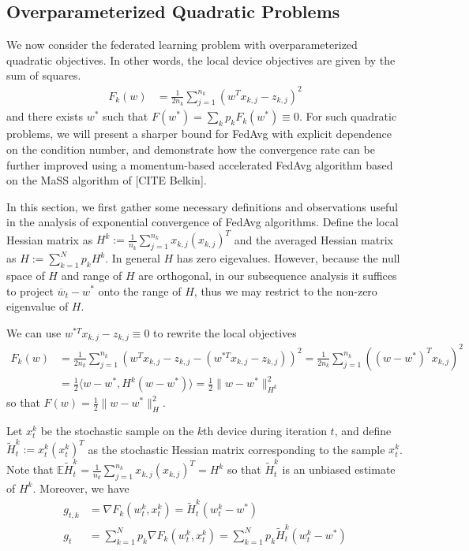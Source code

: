 \subsection{Overparameterized Quadratic Problems}

We now consider the federated learning problem with overparameterized
quadratic objectives. In other words, the local device objectives
are given by the sum of squares. 
\begin{align*}
F_{k}(w) & =\frac{1}{2n_{k}}\sum_{j=1}^{n_{k}}(w^{T}x_{k,j}-z_{k,j})^{2}
\end{align*}
and there exists $w^{\ast}$ such that $F(w^{\ast})=\sum_{k}p_{k}F_{k}(w^{\ast})\equiv0$.
For such quadratic problems, we will present a sharper bound for FedAvg
with explicit dependence on the condition number, and demonstrate
how the convergence rate can be further improved using a momentum-based
accelerated FedAvg algorithm based on the MaSS algorithm of {[}CITE
Belkin{]}. 

In this section, we first gather some necessary definitions and observations
useful in the analysis of exponential convergence of FedAvg algorithms.
Define the local Hessian matrix as $H^{k}:=\frac{1}{n_{k}}\sum_{j=1}^{n_{k}}x_{k,j}(x_{k,j})^{T}$
and the averaged Hessian matrix as $H:=\sum_{k=1}^{N}p_{k}H^{k}$.
In general $H$ has zero eigevalues. However, because the null space
of $H$ and range of $H$ are orthogonal, in our subsequence analysis
it suffices to project $\overline{w}_{t}-w^{\ast}$ onto the range
of $H$, thus we may restrict to the non-zero eigenvalue of $H$. 

We can use $w^{\ast T}x_{k,j}-z_{k,j}\equiv0$ to rewrite the local
objectives 
\begin{align*}
F_{k}(w) & =\frac{1}{2n_{k}}\sum_{j=1}^{n_{k}}(w^{T}x_{k,j}-z_{k,j}-(w^{\ast T}x_{k,j}-z_{k,j}))^{2}=\frac{1}{2n_{k}}\sum_{j=1}^{n_{k}}((w-w^{\ast})^{T}x_{k,j})^{2}\\
& =\frac{1}{2}\langle w-w^{\ast},H^{k}(w-w^{\ast})\rangle=\frac{1}{2}\|w-w^{\ast}\|_{H^{k}}^{2}
\end{align*}
so that $F(w)=\frac{1}{2}\|w-w^{\ast}\|_{H}^{2}$. 

Let $x_{t}^{k}$ be the stochastic sample on the $k$th device during
iteration $t$, and define $\tilde{H}_{t}^{k}:=x_{t}^{k}(x_{t}^{k})^{T}$
as the stochastic Hessian matrix corresponding to the sample $x_{t}^{k}$.
Note that $\mathbb{E}\tilde{H}_{t}^{k}=\frac{1}{n_{k}}\sum_{j=1}^{n_{k}}x_{k,j}(x_{k,j})^{T}=H^{k}$
so that $\tilde{H}_{t}^{k}$ is an unbiased estimate of $H^{k}$.
Moreover, we have
\begin{align*}
g_{t,k} & =\nabla F_{k}(w_{t}^{k},x_{t}^{k})=\tilde{H}_{t}^{k}(w_{t}^{k}-w^{\ast})\\
g_{t} & =\sum_{k=1}^{N}p_{k}\nabla F_{k}(w_{t}^{k},x_{t}^{k})=\sum_{k=1}^{N}p_{k}\tilde{H}_{t}^{k}(w_{t}^{k}-w^{\ast})
\end{align*}

